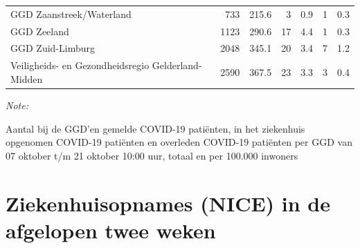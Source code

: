 \documentclass[
  english,
  man,floatsintext]{apa6}
\begin{document}
\begin{table}
\begin{threeparttable}
\begin{tabular}{lrrrrrr}
GGD Zaanstreek/Waterland & 733 & 215.6 & 3 & 0.9 & 1 & 0.3\\
GGD Zeeland & 1123 & 290.6 & 17 & 4.4 & 1 & 0.3\\
GGD Zuid-Limburg & 2048 & 345.1 & 20 & 3.4 & 7 & 1.2\\
Veiligheids- en Gezondheidsregio Gelderland-Midden & 2590 & 367.5 & 23 & 3.3 & 3 & 0.4\\
\bottomrule
\end{tabular}
\begin{tablenotes}
\item \textit{Note: } 
\item Aantal bij de GGD’en gemelde COVID-19 patiënten, in het ziekenhuis opgenomen COVID-19 patiënten en overleden COVID-19 patiënten per GGD van 07 oktober t/m 21 oktober 10:00 uur, totaal en per 100.000 inwoners
\end{tablenotes}
\end{threeparttable}
\endgroup{}
\end{table}

\newpage

\hypertarget{ziekenhuisopnames-nice-in-de-afgelopen-twee-weken}{%
\section{Ziekenhuisopnames (NICE) in de afgelopen twee weken}\label{ziekenhuisopnames-nice-in-de-afgelopen-twee-weken}}
\end{document}
